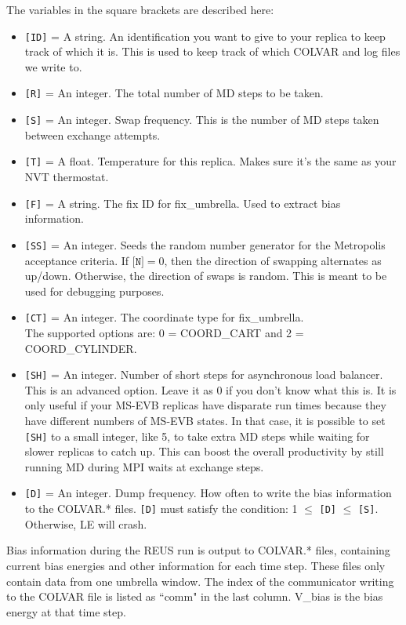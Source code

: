 \documentclass[10pt]{article}
\begin{document}
The variables in the square brackets are described here:
\begin{itemize}
\item	\texttt{[ID]} = A string. An identification you want to give to your replica to keep track of which it is.
		This is used to keep track of which COLVAR and log files we write to.
\item	\texttt{[R]} = An integer. The total number of MD steps to be taken.
\item	\texttt{[S]} = An integer. Swap frequency. This is the number of MD steps taken between exchange attempts.
\item	\texttt{[T]} = A float. Temperature for this replica. Makes sure it's the same as your NVT thermostat.
\item	\texttt{[F]} = A string. The fix ID for fix\_umbrella. Used to extract bias information.
\item	\texttt{[SS]} = An integer. Seeds the random number generator for the Metropolis
		acceptance criteria.
		If $\texttt{[N]} = 0$,
		then the direction of swapping alternates as up/down. Otherwise, the direction of swaps
		is random. This is meant to be used for debugging purposes.
\item	\texttt{[CT]} = An integer. The coordinate type for fix\_umbrella.\\
		The supported options are: 0 = COORD\_CART and 2 = COORD\_CYLINDER.
\item	\texttt{[SH]} = An integer. Number of short steps for asynchronous load balancer. This is an advanced option.
		Leave it as 0 if you don't know what this is. It is only useful if your MS-EVB replicas have disparate run times
		because they have different numbers of MS-EVB states. In that case, it is possible to set \texttt{[SH]} to a
		small integer, like 5, to take extra MD steps while waiting for slower replicas to catch up. This can boost
		the overall productivity by still running MD during MPI waits at exchange steps.
\item	\texttt{[D]} = An integer. Dump frequency. How often to write the bias information to the COLVAR.* files.
		\texttt{[D]} must satisfy the condition: 1 $\le$ \texttt{[D]} $\le$ \texttt{[S]}. Otherwise, LE will crash.
\end{itemize}

Bias information during the REUS run is output to COLVAR.* files, containing current bias energies and other information for each
time step. These files only contain data from one umbrella window. The index of the communicator writing to the COLVAR file is
listed as ``comm" in the last column. V\_bias is the bias energy at that time step.
\end{document}
